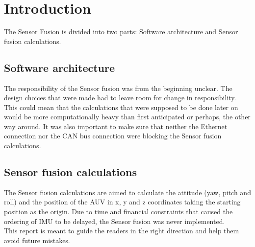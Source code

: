 
\section{Introduction}\label{sec:introduction}
The Sensor Fusion is divided into two parts: Software architecture and Sensor fusion calculations.

\subsection{Software architecture}
The responsibility of the Sensor fusion was from the beginning unclear. The design
choices that were made had to leave room for change in responsibility.
This could mean that the calculations that were supposed to be done later on would be 
more computationally heavy than first anticipated or perhaps, the other way around.
It was also important to make sure that neither the Ethernet connection nor the CAN bus
connection were blocking the Sensor fusion calculations.

\subsection{Sensor fusion calculations}
The Sensor fusion calculations are aimed to calculate the attitude
(yaw, pitch and roll) and the position of the AUV in x, y and z
coordinates taking the starting position as the origin. Due to time and financial 
constraints that caused the ordering of IMU to be delayed, the Sensor fusion was never implemented. \\
This report
is meant to guide the readers in the right direction and help them avoid
future mistakes.
